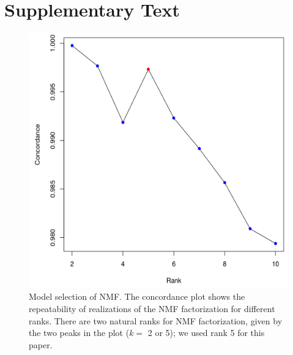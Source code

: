 \clearpage

\section{Supplementary Text}




\begin{figure}[!ht]
\centering
\includegraphics[width=\textwidth]{NMF/figures/figS1}
  \caption{Model selection of NMF. The concordance plot shows the repeatability of realizations of the NMF factorization for different ranks.  There are two natural ranks for NMF factorization, given by the two peaks in the plot ($k=$ 2 or 5); we used rank 5 for this paper.}
 \label{ModelSelection}
\end{figure}


